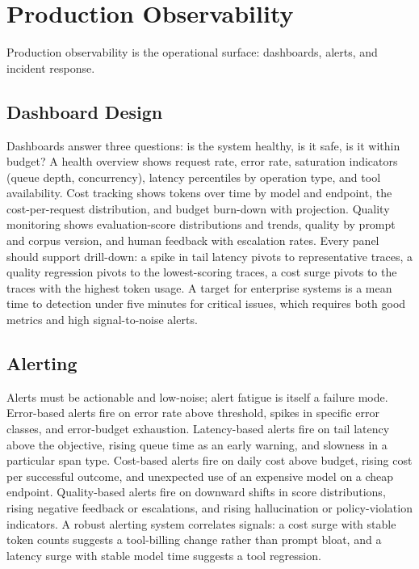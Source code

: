 \documentclass[11pt]{book}
\begin{document}
\section{Production Observability}

Production observability is the operational surface: dashboards, alerts, and incident response.

\subsection{Dashboard Design}

Dashboards answer three questions: is the system healthy, is it safe, is it within budget? A health overview shows request rate, error rate, saturation indicators (queue depth, concurrency), latency percentiles by operation type, and tool availability. Cost tracking shows tokens over time by model and endpoint, the cost-per-request distribution, and budget burn-down with projection. Quality monitoring shows evaluation-score distributions and trends, quality by prompt and corpus version, and human feedback with escalation rates. Every panel should support drill-down: a spike in tail latency pivots to representative traces, a quality regression pivots to the lowest-scoring traces, a cost surge pivots to the traces with the highest token usage. A target for enterprise systems \cite{guardrails2025} is a mean time to detection under five minutes for critical issues, which requires both good metrics and high signal-to-noise alerts.

\subsection{Alerting}

Alerts must be actionable and low-noise; alert fatigue is itself a failure mode. Error-based alerts fire on error rate above threshold, spikes in specific error classes, and error-budget exhaustion. Latency-based alerts fire on tail latency above the objective, rising queue time as an early warning, and slowness in a particular span type. Cost-based alerts fire on daily cost above budget, rising cost per successful outcome, and unexpected use of an expensive model on a cheap endpoint. Quality-based alerts fire on downward shifts in score distributions, rising negative feedback or escalations, and rising hallucination or policy-violation indicators. A robust alerting system correlates signals: a cost surge with stable token counts suggests a tool-billing change rather than prompt bloat, and a latency surge with stable model time suggests a tool regression.
\end{document}
